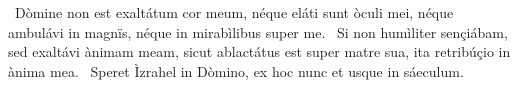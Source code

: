 \psalmChapterWithInscription{}
{ }
{%
~Dòmine non est exaltátum cor meum, néque eláti sunt òculi mei, néque ambulávi in magnïs, néque in mirabìlibus super me. 
~Si non humìliter sençiábam, sed exaltávi ànimam meam, sicut ablactátus est super matre sua, ita retribúçio in ànima mea. 
~Speret Ìzrahel in Dòmino, ex hoc nunc et usque in sáeculum. 
}
